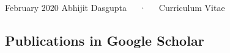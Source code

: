 \documentclass[11pt, a4paper]{awesome-cv}
\begin{document}
\makecvheader

\makecvfooter
  {February 2020}
    {Abhijit Dasgupta~~~·~~~Curriculum Vitae}
  {\thepage}





\hypertarget{publications-in-google-scholar}{%
\subsection{Publications in Google Scholar}\label{publications-in-google-scholar}}
\end{document}
